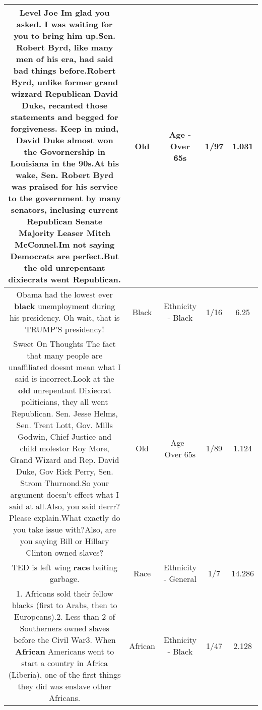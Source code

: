 \documentclass[11pt]{article}
\newlength\mylength
\begin{document}
\begin{center}
\begin{longtable}{|C{.65\mylength}|C{.30\mylength}|C{.12\mylength}|C{.12\mylength}|C{.12\mylength}|}
  \small Level Joe Im glad you asked. I was waiting for you to bring him up.Sen. Robert Byrd, like many men of his era, had said bad things before.Robert Byrd, unlike former grand wizzard Republican David Duke, recanted those statements and begged for forgiveness. Keep in mind, David Duke almost won the Govornership in Louisiana in the 90s.At his wake, Sen. Robert Byrd was praised for his service to the government by many senators, inclusing current Republican Senate Majority Leaser Mitch McConnel.Im not saying Democrats are perfect.But the \textbf{old} unrepentant dixiecrats went Republican.\normalsize   & Old & Age - Over 65s & 1/97 & 1.031 \\  \hline
  \small Obama had the lowest ever \textbf{black} unemployment during his presidency. Oh wait, that is TRUMP'S presidency!\normalsize   & Black & Ethnicity - Black & 1/16 & 6.25 \\  \hline
  \small Sweet On Thoughts The fact that many people are unaffiliated doesnt mean what I said is incorrect.Look at the \textbf{old} unrepentant Dixiecrat politicians, they all went Republican. Sen. Jesse Helms, Sen. Trent Lott, Gov. Mills Godwin, Chief Justice and child molestor Roy More, Grand Wizard and Rep. David Duke, Gov Rick Perry, Sen. Strom Thurnond.So your argument doesn't effect what I said at all.Also, you said derrr? Please explain.What exactly do you take issue with?Also, are you saying Bill or Hillary Clinton owned slaves?\normalsize   & Old & Age - Over 65s & 1/89 & 1.124 \\  \hline
  \small TED is left wing \textbf{race} baiting garbage.\normalsize   & Race & Ethnicity - General & 1/7 & 14.286 \\  \hline
  \small 1. Africans sold their fellow blacks (first to Arabs, then to Europeans).2. Less than 2 of Southerners owned slaves before the Civil War3. When \textbf{African} Americans went to start a country in Africa (Liberia), one of the first things they did was enslave other Africans.\normalsize   & African & Ethnicity - Black & 1/47 & 2.128 \\  \hline

\end{longtable}
\end{center}
\end{document}

